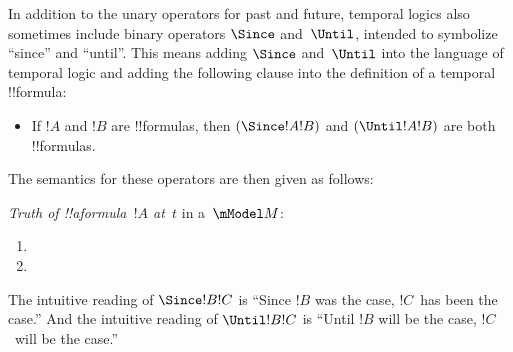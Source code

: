 \documentclass[../../../include/open-logic-section]{subfiles}
\begin{document}


In addition to the unary operators for past and future, temporal logics also sometimes
include binary operators $\Since $ and~$\Until$, intended to symbolize ``since'' and ``until''. This means
adding $\Since $ and~$\Until$ into the language of temporal logic and adding the following clause
into the definition of a temporal !!{formula}:

\begin{itemize}
\item[] If $!A$ and $!B$ are !!{formula}s, then $(\Since  !A !B)$ and $(\Until !A !B)$ are both !!{formula}s.
\end{itemize}

The semantics for these operators are then given as follows:
\begin{defn}
  \emph{Truth of !!a{formula}~$!A$ at~$t$} in a~$\mModel M$:
  \begin{enumerate}
  \item{}
   \item{}
  \end{enumerate} 
\end{defn}

The intuitive reading of $\Since  !B !C$ is ``Since $!B$ was the case, $!C$~has been the case.'' And the
intuitive reading of $\Until !B !C$ is ``Until $!B$ will be the case, $!C$~will be the case.''
\end{document}
